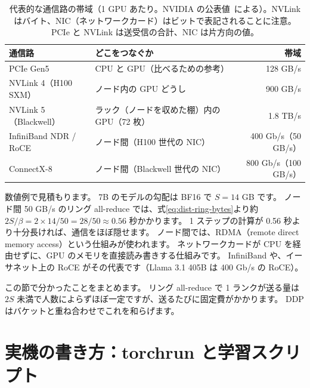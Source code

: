 \begin{table}[tbp]
\centering
\caption{代表的な通信路の帯域（1 GPU あたり。NVIDIA の公表値~\cite{nvidia2026h100,nvidia2026dgxh100,nvidia2026gb200}による）。NVLink はバイト、NIC（ネットワークカード）はビットで表記されることに注意。PCIe と NVLink は送受信の合計、NIC は片方向の値。}
\label{tab:dist-links}
\small
\setlength{\tabcolsep}{4pt}
\begin{tabular}{l>{\raggedright\arraybackslash}p{52mm}r}
\toprule
通信路 & どこをつなぐか & 帯域 \\
\midrule
PCIe Gen5 & CPU と GPU（比べるための参考） & 128 GB/s \\
NVLink 4（H100 SXM） & ノード内の GPU どうし & 900 GB/s \\
NVLink 5（Blackwell） & ラック（ノードを収めた棚）内の GPU（72 枚）  & 1.8 TB/s \\
InfiniBand NDR / RoCE & ノード間（H100 世代の NIC） & 400 Gb/s（50 GB/s） \\
ConnectX-8 & ノード間（Blackwell 世代の NIC） & 800 Gb/s（100 GB/s） \\
\bottomrule
\end{tabular}
\end{table}

数値例で見積もります。
7B のモデルの勾配は BF16 で $S=14$ GB です。
ノード間 50 GB/s のリング all-reduce では、式\eqref{eq:dist-ring-bytes}より約 $2S/\beta=2\times14/50=28/50\approx 0.56$ 秒かかります。
1 ステップの計算が 0.56 秒より十分長ければ、通信をほぼ隠せます。
ノード間では、RDMA（remote direct memory access）という仕組みが使われます。
ネットワークカードが CPU を経由せずに、GPU のメモリを直接読み書きする仕組みです。
InfiniBand や、イーサネット上の RoCE がその代表です（Llama 3.1 405B は 400 Gb/s の RoCE\cite{dubey2024llama3}）。

この節で分かったことをまとめます。
リング all-reduce で 1 ランクが送る量は $2S$ 未満で人数によらずほぼ一定ですが、送るたびに固定費がかかります。
DDP はバケットと重ね合わせでこれを和らげます。

\section{実機の書き方：torchrun と学習スクリプト}\label{sec:dist-torchrun}

